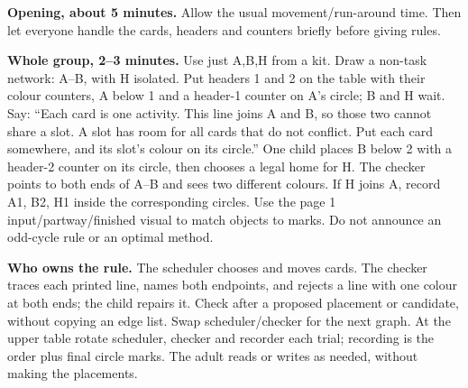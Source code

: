 \documentclass[10pt,letterpaper]{article}
\newcommand{\topic}[1]{\vspace{3pt}{\large\bfseries #1}\par}
\newcommand{\labelled}[2]{\textbf{#1} #2\par}
\begin{document}
\newpage
\topic{A common launch, then choices at fixed tables}
\labelled{Opening, about 5 minutes.}{Allow the usual movement/run-around time. Then let everyone handle the cards, headers and counters briefly before giving rules.}
\labelled{Whole group, 2--3 minutes.}{Use just A,B,H from a kit. Draw a non-task network: A--B, with H isolated. Put headers 1 and 2 on the table with their colour counters, A below 1 and a header-1 counter on A's circle; B and H wait. Say: ``Each card is one activity. This line joins A and B, so those two cannot share a slot. A slot has room for all cards that do not conflict. Put each card somewhere, and its slot's colour on its circle.'' One child places B below 2 with a header-2 counter on its circle, then chooses a legal home for H. The checker points to both ends of A--B and sees two different colours. If H joins A, record A1, B2, H1 inside the corresponding circles. Use the page 1 input/partway/finished visual to match objects to marks. Do not announce an odd-cycle rule or an optimal method.}
\begin{center}
\end{center}
\labelled{Who owns the rule.}{The scheduler chooses and moves cards. The checker traces each printed line, names both endpoints, and rejects a line with one colour at both ends; the child repairs it. Check after a proposed placement or candidate, without copying an edge list. Swap scheduler/checker for the next graph. At the upper table rotate scheduler, checker and recorder each trial; recording is the order plus final circle marks. The adult reads or writes as needed, without making the placements.}
\end{document}
